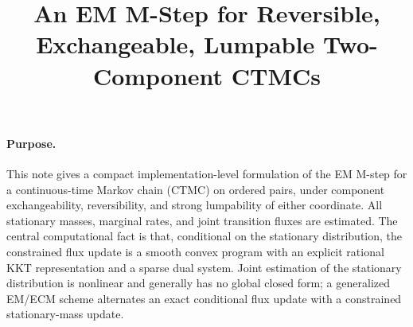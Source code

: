 \documentclass[10pt]{article}
\title{An EM M-Step for Reversible, Exchangeable, Lumpable Two-Component CTMCs}
\author{}
\date{}
\begin{document}
\maketitle
\vspace{-1.2em}

\paragraph{Purpose.}
This note gives a compact implementation-level formulation of the EM M-step for a continuous-time Markov chain (CTMC) on ordered pairs, under component exchangeability, reversibility, and strong lumpability of either coordinate.  All stationary masses, marginal rates, and joint transition fluxes are estimated.  The central computational fact is that, conditional on the stationary distribution, the constrained flux update is a smooth convex program with an explicit rational KKT representation and a sparse dual system.  Joint estimation of the stationary distribution is nonlinear and generally has no global closed form; a generalized EM/ECM scheme alternates an exact conditional flux update with a constrained stationary-mass update.
\end{document}
